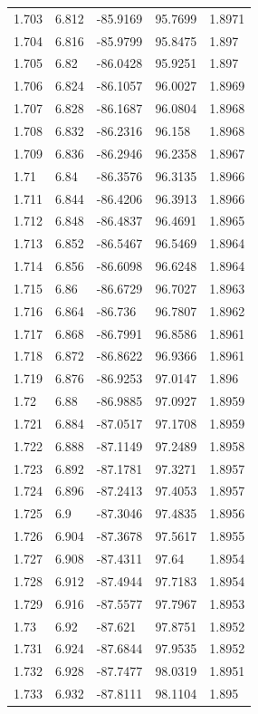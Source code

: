 \begin{tabular}{lllll}
1.703 & 6.812 & -85.9169 & 95.7699 & 1.8971 \\
1.704 & 6.816 & -85.9799 & 95.8475 & 1.897 \\
1.705 & 6.82 & -86.0428 & 95.9251 & 1.897 \\
1.706 & 6.824 & -86.1057 & 96.0027 & 1.8969 \\
1.707 & 6.828 & -86.1687 & 96.0804 & 1.8968 \\
1.708 & 6.832 & -86.2316 & 96.158 & 1.8968 \\
1.709 & 6.836 & -86.2946 & 96.2358 & 1.8967 \\
1.71 & 6.84 & -86.3576 & 96.3135 & 1.8966 \\
1.711 & 6.844 & -86.4206 & 96.3913 & 1.8966 \\
1.712 & 6.848 & -86.4837 & 96.4691 & 1.8965 \\
1.713 & 6.852 & -86.5467 & 96.5469 & 1.8964 \\
1.714 & 6.856 & -86.6098 & 96.6248 & 1.8964 \\
1.715 & 6.86 & -86.6729 & 96.7027 & 1.8963 \\
1.716 & 6.864 & -86.736 & 96.7807 & 1.8962 \\
1.717 & 6.868 & -86.7991 & 96.8586 & 1.8961 \\
1.718 & 6.872 & -86.8622 & 96.9366 & 1.8961 \\
1.719 & 6.876 & -86.9253 & 97.0147 & 1.896 \\
1.72 & 6.88 & -86.9885 & 97.0927 & 1.8959 \\
1.721 & 6.884 & -87.0517 & 97.1708 & 1.8959 \\
1.722 & 6.888 & -87.1149 & 97.2489 & 1.8958 \\
1.723 & 6.892 & -87.1781 & 97.3271 & 1.8957 \\
1.724 & 6.896 & -87.2413 & 97.4053 & 1.8957 \\
1.725 & 6.9 & -87.3046 & 97.4835 & 1.8956 \\
1.726 & 6.904 & -87.3678 & 97.5617 & 1.8955 \\
1.727 & 6.908 & -87.4311 & 97.64 & 1.8954 \\
1.728 & 6.912 & -87.4944 & 97.7183 & 1.8954 \\
1.729 & 6.916 & -87.5577 & 97.7967 & 1.8953 \\
1.73 & 6.92 & -87.621 & 97.8751 & 1.8952 \\
1.731 & 6.924 & -87.6844 & 97.9535 & 1.8952 \\
1.732 & 6.928 & -87.7477 & 98.0319 & 1.8951 \\
1.733 & 6.932 & -87.8111 & 98.1104 & 1.895 \\

\end{tabular}
